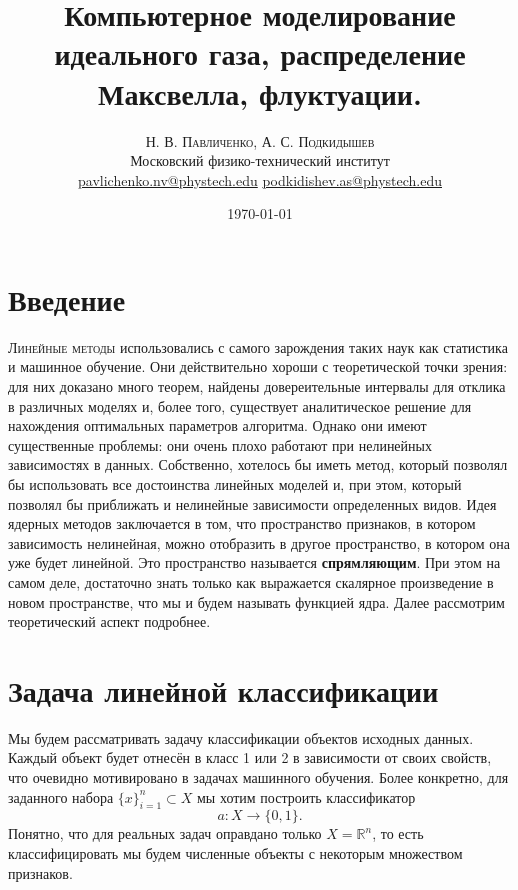 \documentclass[twoside,twocolumn]{article}
\title{Компьютерное моделирование идеального газа, распределение Максвелла, флуктуации.} %
\author{%
\textsc{Н. В. Павличенко, А. С. Подкидышев} \\[1ex] %
\normalsize Московский физико-технический институт \\ %
\normalsize \href{mailto:pavlichenko.nv@phystech.edu}{pavlichenko.nv@phystech.edu} 
\href{mailto:pavlichenko.nv@phystech.edu}{podkidishev.as@phystech.edu}%
}
\date{\today} %
\theoremstyle{plain}
\theoremstyle{definition}
\begin{document}
\maketitle


\section{Введение}

\lettrine[nindent=0em,lines=3]{Л} {инейные методы} использовались с самого зарождения таких наук как статистика и машинное обучение.
 Они действительно хороши с теоретической точки зрения: для них доказано много теорем, найдены
довереительные интервалы для отклика в различных моделях и, более того, существует аналитическое решение для нахождения
оптимальных параметров алгоритма. Однако они имеют существенные проблемы: они очень плохо работают при нелинейных
зависимостях в данных. Собственно, хотелось бы иметь метод, который позволял бы использовать все достоинства линейных моделей
и, при этом, который позволял бы приближать и нелинейные зависимости определенных видов. Идея ядерных методов заключается в
том, что пространство признаков, в котором зависимость нелинейная, можно отобразить в другое пространство, в котором она уже
будет линейной. Это пространство называется \textbf{спрямляющим}. При этом на самом деле, достаточно знать только как выражается скалярное
произведение в новом пространстве, что мы и будем называть функцией ядра. Далее рассмотрим теоретический аспект подробнее.

\section{Задача линейной классификации}
Мы будем рассматривать задачу классификации объектов исходных данных. Каждый объект будет отнесён в класс 1 или 2 в зависимости от своих свойств, что очевидно мотивировано в задачах машинного обучения. Более конкретно, для заданного набора $\{x\}_{i = 1}^n \subset X$ мы хотим построить классификатор 
\[a: X \xrightarrow{} \{0, 1\}.\]
Понятно, что для реальных задач оправдано только $X = \mathbb{R}^n$, то есть классифицировать мы будем численные объекты с некоторым множеством признаков.
\end{document}
